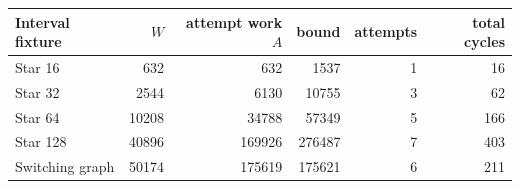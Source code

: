 \begin{center}
\small
\begin{tabular}{lrrrrr}
\toprule
Interval fixture & $W$ & attempt work $A$ & bound & attempts & total cycles\\
\midrule
Star 16 & 632 & 632 & 1537 & 1 & 16\\
Star 32 & 2544 & 6130 & 10755 & 3 & 62\\
Star 64 & 10208 & 34788 & 57349 & 5 & 166\\
Star 128 & 40896 & 169926 & 276487 & 7 & 403\\
Switching graph & 50174 & 175619 & 175621 & 6 & 211\\
\bottomrule
\end{tabular}
\end{center}
